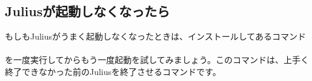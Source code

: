 \subsection{Juliusが起動しなくなったら}
もしもJuliusがうまく起動しなくなったときは、インストールしてあるコマンド\\
\\
を一度実行してからもう一度起動を試してみましょう。このコマンドは、上手く終了できなかった前のJuliusを終了させるコマンドです。